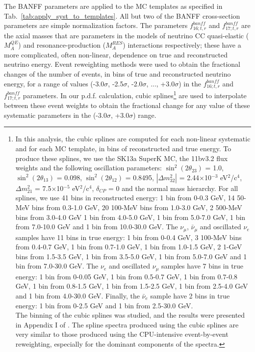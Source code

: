 \begin{enumerate}
The BANFF parameters are applied to the MC templates as specified in Tab.\ \ref{tab:apply_syst_to_templates}.
All but two of the BANFF cross-section parameters are simple normalization factors.
The parameters $f_{16; t, r}^{banff}$ and $f_{17; t, r}^{banff}$ are
the axial masses that are parameters in the models of neutrino CC quasi-elastic ($M_{A}^{QE}$) 
and resonance-production ($M_{A}^{RES}$) interactions respectively;
these have a more complicated, often non-linear, dependence on true and reconstructed neutrino energy.
Event reweighting methods were used to obtain the fractional changes of the number of events, 
in bins of true and reconstructed neutrino energy, for a range of values (-3.0$\sigma$, -2.5$\sigma$, -2.0$\sigma$, ..., +3.0$\sigma$)
in the $f_{16; t, r}^{banff}$ and $f_{17; t, r}^{banff}$ parameters.
In our p.d.f. calculation, cubic splines\footnote{
  In this analysis, the cubic splines are computed for each non-linear systematic and for each MC template,
  in bins of reconstructed and true energy. To produce these splines, we use the SK13a SuperK MC, the 11bv3.2 flux weights and 
  the following oscillation parameters: $\sin^{2}(2\theta_{23})$ = 1.0, $\sin^{2}(2\theta_{13})$ = 0.098, $\sin^{2}(2\theta_{12})$ = 
  0.8495, $|\Delta m^{2}_{32}|$ = 2.44$\times$10$^{-3}$ eV$^{2}$/c$^{4}$, $\Delta m^{2}_{21}$ = 7.5$\times$10$^{-5}$ eV$^{2}$/c$^{4}$, 
  $\delta_{CP}$ = 0 and the normal mass hierarchy. For all splines, we use 41 bins in reconstructed energy:
  1 bin from 0-0.3 GeV, 14 50-MeV bins from 0.3-1.0 GeV, 20 100-MeV bins from 1.0-3.0 GeV, 2 500-MeV bins from 3.0-4.0 GeV
  1 bin from 4.0-5.0 GeV, 1 bin from 5.0-7.0 GeV, 1 bin from 7.0-10.0 GeV and 1 bin from 10.0-30.0 GeV.
  The $\nu_{\mu}$, $\bar{\nu}_{\mu}$ and oscillated $\nu_{e}$ samples have 11 bins in true energy:
  1 bin from 0-0.4 GeV, 3 100-MeV bins from 0.4-0.7 GeV, 1 bin from 0.7-1.0 GeV, 1 bin from 1.0-1.5 GeV, 2 1-GeV bins from 1.5-3.5 GeV,
  1 bin from 3.5-5.0 GeV, 1 bin from 5.0-7.0 GeV and 1 bin from 7.0-30.0 GeV.
  The $\nu_{e}$ and oscillated $\nu_\mu$ samples have 7 bins in true energy:
  1 bin from 0-0.05 GeV, 1 bin from 0.5-0.7 GeV, 1 bin from 0.7-0.8 GeV,
  1 bin from 0.8-1.5 GeV, 1 bin from 1.5-2.5 GeV, 1 bin from 2.5-4.0 GeV and 1 bin from 4.0-30.0 GeV.
  Finally, the $\bar{\nu}_{e}$ sample have 2 bins in true energy:
  1 bin from 0-2.5 GeV and 1 bin from 2.5-30.0 GeV.\\
  The binning of the cubic splines was studied, and the results were presented in Appendix I of \cite{OurRun123DisappAnalysis3Flavour}.
  The spline spectra produced using the cubic splines are very similar to those produced using the CPU-intensive event-by-event reweighting,
  especially for the dominant components of the spectra. 
} 
are used to interpolate between these event weights 
to obtain the fractional change for any value of these systematic parameters in the (-3.0$\sigma$, +3.0$\sigma$) range.\\


\end{enumerate}
